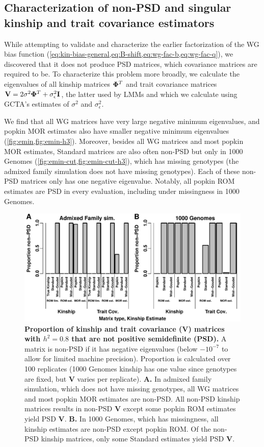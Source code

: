 \documentclass[11pt]{article}
\newcommand{\kinMat}[1][T]{%
  \ensuremath{%
    \mathbf{\Phi}^{#1}
  }%
  \xspace%
}%
\begin{document}
\begin{linenumbers}
\subsection{Characterization of non-PSD and singular kinship and trait covariance estimators}

While attempting to validate and characterize the earlier factorization of the WG bias function (\cref{eq:kin-bias-general,eq:B-shift,eq:wg-fac-b,eq:wg-fac-q}), we discovered that it does not produce PSD matrices, which covariance matrices are required to be.
To characterize this problem more broadly, we calculate the eigenvalues of all kinship matrices $\kinMat$ and trait covariance matrices $\mathbf{V} = 2 \sigma^2 \kinMat + \sigma^2_\epsilon \mathbf{I}$, the latter used by LMMs and which we calculate using GCTA's estimates of $\sigma^2$ and $\sigma^2_\epsilon$.

We find that all WG matrices have very large negative minimum eigenvalues, and popkin MOR estimates also have smaller negative minimum eigenvalues (\cref{fig:emin,fig:emin-h3}).
Moreover, besides all WG matrices and most popkin MOR estimates, Standard matrices are also often non-PSD but only in 1000 Genomes (\cref{fig:emin-cut,fig:emin-cut-h3}), which has missing genotypes (the admixed family simulation does not have missing genotypes).
Each of these non-PSD matrices only has one negative eigenvalue.
Notably, all popkin ROM estimates are PSD in every evaluation, including under missingness in 1000 Genomes.

\begin{figure}[bp!]
  \centering
  \includegraphics[width=\textwidth]{emin-cut.pdf}
  \caption{
    {\bf Proportion of kinship and trait covariance ($\mathbf{V}$) matrices with $h^2=0.8$ that are not positive semidefinite (PSD).}
    A matrix is non-PSD if it has negative eigenvalues (below $-10^{-7}$ to allow for limited machine precision).
    Proportion is calculated over 100 replicates (1000 Genomes kinship has one value since genotypes are fixed, but $\mathbf{V}$ varies per replicate).
    \textbf{A.}
    In admixed family simulation, which does not have missing genotypes, all WG matrices and most popkin MOR estimates are non-PSD.
    All non-PSD kinship matrices results in non-PSD $\mathbf{V}$ except some popkin ROM estimates yield PSD $\mathbf{V}$.
    \textbf{B.}
    In 1000 Genomes, which has missingness, all kinship estimates are non-PSD except popkin ROM.
    Of the non-PSD kinship matrices, only some Standard estimates yield PSD $\mathbf{V}$.
  }
  \label{fig:emin-cut}
\end{figure}


\end{linenumbers}
\end{document}
